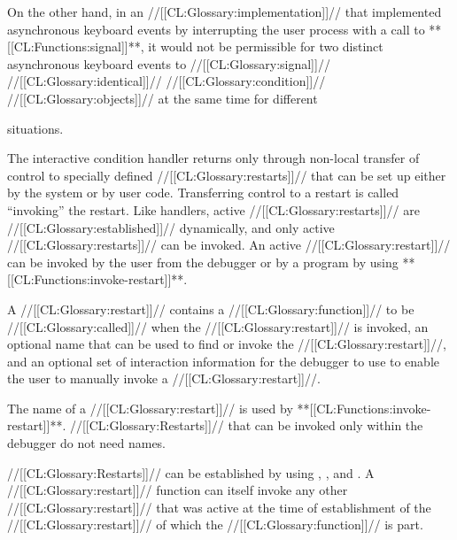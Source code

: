 On the other hand, in an //[[CL:Glossary:implementation]]// that implemented asynchronous 
keyboard events by interrupting the user process with a call to **[[CL:Functions:signal]]**,
it would not be permissible for two distinct asynchronous keyboard events
to //[[CL:Glossary:signal]]// //[[CL:Glossary:identical]]// //[[CL:Glossary:condition]]// //[[CL:Glossary:objects]]//
at the same time for different 


situations.

 
\endsubsubsubsection%

\endsubsubsection%
 

The interactive condition handler returns only through
non-local transfer of control to specially defined //[[CL:Glossary:restarts]]//
that can be set up either by the system or by user code.  Transferring
control to a restart is called ``invoking'' the restart.  Like
handlers, active //[[CL:Glossary:restarts]]// are //[[CL:Glossary:established]]//
dynamically, and 
only active //[[CL:Glossary:restarts]]//
can be invoked.  An active 
//[[CL:Glossary:restart]]// can be invoked by the user from
the debugger or by a program by using **[[CL:Functions:invoke-restart]]**.
 

A //[[CL:Glossary:restart]]// contains a 
//[[CL:Glossary:function]]// to be //[[CL:Glossary:called]]// when the //[[CL:Glossary:restart]]// is
invoked, an optional name that can be used to find or invoke the 
//[[CL:Glossary:restart]]//, and
an optional set of interaction information for the debugger to use to
enable the user to manually invoke a //[[CL:Glossary:restart]]//. 




The name of a //[[CL:Glossary:restart]]// is
used by **[[CL:Functions:invoke-restart]]**. //[[CL:Glossary:Restarts]]// that can be invoked
only within the debugger do not need names.











 
//[[CL:Glossary:Restarts]]// can be established by using , 
, and .
A //[[CL:Glossary:restart]]// function can itself invoke any other //[[CL:Glossary:restart]]//
that was active at the time of establishment of the //[[CL:Glossary:restart]]// 
of which the //[[CL:Glossary:function]]// is part.

